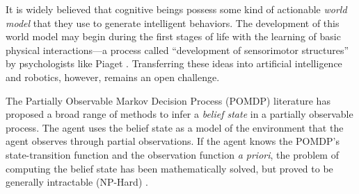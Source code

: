 \documentclass[runningheads]{llncs}
\begin{document}
It is widely believed that cognitive beings possess some kind of actionable \textit{world model} that they use to generate intelligent behaviors.
The development of this world model may begin during the first stages of life with the learning of basic physical interactions---a process called ``development of sensorimotor structures'' by psychologists like Piaget \cite[p. 104]{dolle_pour_2005}. 
Transferring these ideas into artificial intelligence and robotics, however,  remains an open challenge.



The Partially Observable Markov Decision Process (POMDP) literature has proposed a broad range of methods to infer a \textit{belief state} in a partially observable process.
The agent uses the belief state as a model of the environment that the agent observes through partial observations.  
If the agent knows the POMDP's state-transition function and the observation function \textit{a priori}, the problem of computing the belief state has been mathematically solved, but proved to be generally intractable (NP-Hard) \cite{astrom1965optimal}. 
\end{document}
